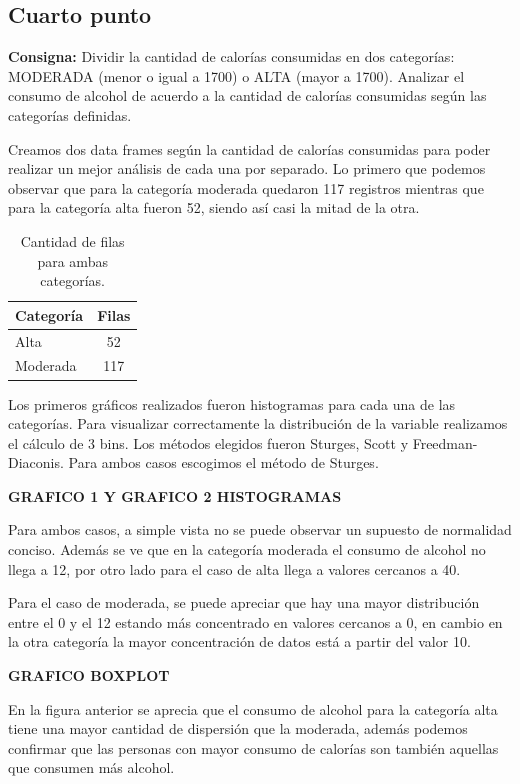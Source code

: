 \documentclass{article} %
\begin{document}
\subsection{Cuarto punto}

\textbf{Consigna:} Dividir la cantidad de calorías consumidas en dos categorías: MODERADA (menor o igual a 1700) o ALTA (mayor a 1700). Analizar el consumo de alcohol de acuerdo a la cantidad de calorías consumidas según las categorías definidas.

Creamos dos data frames según la cantidad de calorías consumidas para poder realizar un mejor análisis de cada una por separado. Lo primero que podemos observar que para la categoría moderada quedaron 117 registros mientras que para la categoría alta fueron 52, siendo así casi la mitad de la otra.

\begin{table}[H]
	\centering
		\begin{tabular}{||l | c ||}
			\hline
			\hline
			Categoría & 	Filas\\
			\hline			
			\hline
			Alta & 52\\
			\hline
			Moderada & 117\\
			\hline
			\hline
		\end{tabular}
		\caption{Cantidad de filas para ambas categorías.}
	\label{tab:table-punto-1-4}
\end{table}

Los primeros gráficos realizados fueron histogramas para cada una de las categorías. Para visualizar correctamente la distribución de la variable realizamos el cálculo de 3 bins. Los métodos elegidos fueron Sturges, Scott y Freedman-Diaconis. Para ambos casos escogimos el método de Sturges.

\textbf{GRAFICO 1 Y GRAFICO 2 HISTOGRAMAS}

Para ambos casos, a simple vista no se puede observar un supuesto de normalidad conciso. Además se ve que en la categoría moderada el consumo de alcohol no llega a 12, por otro lado para el caso de alta llega a valores cercanos a 40.

Para el caso de moderada, se puede apreciar que hay una mayor distribución entre el 0 y el 12 estando más concentrado en valores cercanos a 0, en cambio en la otra categoría la mayor concentración de datos está a partir del valor 10.

\textbf{GRAFICO BOXPLOT}

En la figura anterior se aprecia que el consumo de alcohol para la categoría alta tiene una mayor cantidad de dispersión que la moderada, además podemos confirmar que las personas con mayor consumo de calorías son también aquellas que consumen más alcohol. 
\end{document}
